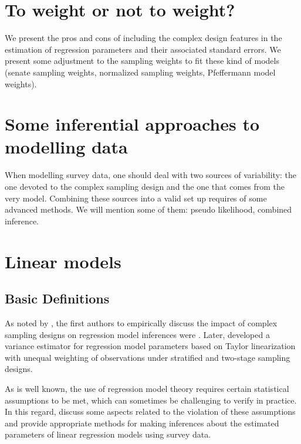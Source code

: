 \documentclass[
  12pt,
]{book}
\begin{document}
\hypertarget{to-weight-or-not-to-weight}{%
\section{To weight or not to weight?}\label{to-weight-or-not-to-weight}}

We present the pros and cons of including the complex design features in the estimation of regression parameters and their associated standard errors. We present some adjustment to the sampling weights to fit these kind of models (senate sampling weights, normalized sampling weights, Pfeffermann model weights).

\hypertarget{some-inferential-approaches-to-modelling-data}{%
\section{Some inferential approaches to modelling data}\label{some-inferential-approaches-to-modelling-data}}

When modelling survey data, one should deal with two sources of variability: the one devoted to the complex sampling design and the one that comes from the very model. Combining these sources into a valid set up requires of some advanced methods. We will mention some of them: pseudo likelihood, combined inference.

\hypertarget{linear-models}{%
\section{Linear models}\label{linear-models}}

\hypertarget{basic-definitions}{%
\subsection{Basic Definitions}\label{basic-definitions}}

As noted by \citet{Heeringa_West_Berglund_2017}, the first authors to empirically discuss the impact of complex sampling designs on regression model inferences were \citet{kish1974inference}. Later, \citet{fuller1975regression} developed a variance estimator for regression model parameters based on Taylor linearization with unequal weighting of observations under stratified and two-stage sampling designs.

As is well known, the use of regression model theory requires certain statistical assumptions to be met, which can sometimes be challenging to verify in practice. In this regard, \citet{shah1977inference} discuss some aspects related to the violation of these assumptions and provide appropriate methods for making inferences about the estimated parameters of linear regression models using survey data.
\end{document}
